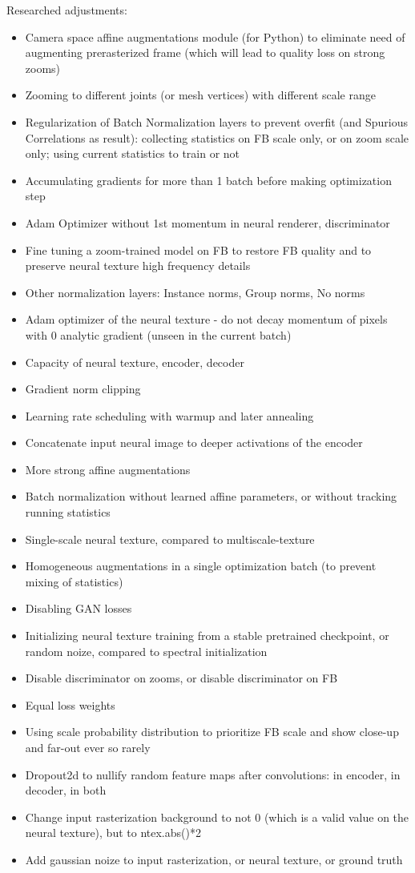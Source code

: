 Researched adjustments:
\begin{itemize}
	\item Camera space affine augmentations module (for Python) to eliminate need of augmenting prerasterized frame (which will lead to quality loss on strong zooms)
	\item Zooming to different joints (or mesh vertices) with different scale range 
	\item Regularization of Batch Normalization layers to prevent overfit (and Spurious Correlations as result): collecting statistics on FB scale only, or on zoom scale only; using current statistics to train or not
	\item Accumulating gradients for more than 1 batch before making optimization step
	\item Adam Optimizer without 1st momentum in neural renderer, discriminator
	\item Fine tuning a zoom-trained model on FB to restore FB quality and to preserve neural texture high frequency details
	\item Other normalization layers: Instance norms, Group norms, No norms
	\item Adam optimizer of the neural texture - do not decay momentum of pixels with 0 analytic gradient (unseen in the current batch)
	\item Capacity of neural texture, encoder, decoder
	\item Gradient norm clipping
	\item Learning rate scheduling with warmup and later annealing
	\item Concatenate input neural image to deeper activations of the encoder
	\item More strong affine augmentations 
	\item Batch normalization without learned affine parameters, or without tracking running statistics 
	\item Single-scale neural texture, compared to multiscale-texture
	\item Homogeneous augmentations in a single optimization batch (to prevent mixing of statistics)
	\item Disabling GAN losses
	\item Initializing neural texture training from a stable pretrained checkpoint, or random noize, compared to spectral initialization
	\item Disable discriminator on zooms, or disable discriminator on FB
	\item Equal loss weights
	\item Using scale probability distribution to prioritize FB scale and show close-up and far-out ever so rarely
	\item Dropout2d to nullify random feature maps after convolutions: in encoder, in decoder, in both
	\item Change input rasterization background to not 0 (which is a valid value on the neural texture), but to ntex.abs()*2
	\item Add gaussian noize to input rasterization, or neural texture, or ground truth
	
\end{itemize}

